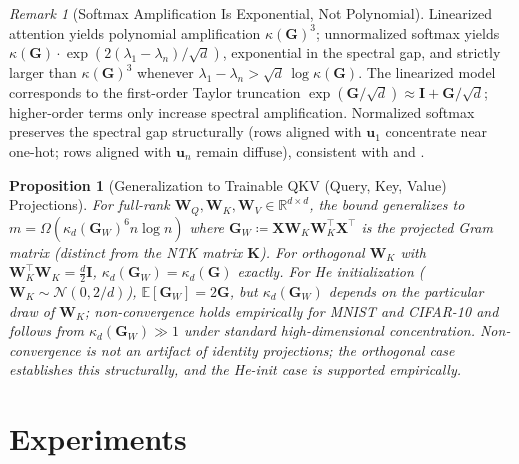 \documentclass{article}
\theoremstyle{plain}
\newtheorem{proposition}[theorem]{Proposition}
\theoremstyle{definition}
\theoremstyle{remark}
\newtheorem{remark}[theorem]{Remark}
\newcommand{\R}{\mathbb{R}}
\newcommand{\E}{\mathbb{E}}
\begin{document}
\begin{remark}[Softmax Amplification Is Exponential, Not Polynomial]
\label{rmk:softmax_vs_linear}
Linearized attention yields polynomial amplification $\kappa(\mathbf{G})^3$; unnormalized softmax yields $\kappa(\mathbf{G})\cdot\exp(2(\lambda_1-\lambda_n)/\sqrt{d})$, exponential in the spectral gap, and strictly larger than $\kappa(\mathbf{G})^3$ whenever $\lambda_1 - \lambda_n > \sqrt{d}\,\log\kappa(\mathbf{G})$. The linearized model corresponds to the first-order Taylor truncation $\exp(\mathbf{G}/\sqrt{d}) \approx \mathbf{I} + \mathbf{G}/\sqrt{d}$; higher-order terms only increase spectral amplification. Normalized softmax preserves the spectral gap structurally (rows aligned with $\mathbf{u}_1$ concentrate near one-hot; rows aligned with $\mathbf{u}_n$ remain diffuse), consistent with \citet{bae2022ifsanswer} and \citet{sakai2025nngp}.
\end{remark}

\begin{proposition}[Generalization to Trainable QKV (Query, Key, Value) Projections]
\label{prop:qkv_generalization}
For full-rank $\mathbf{W}_Q, \mathbf{W}_K, \mathbf{W}_V \in \R^{d \times d}$, the bound generalizes to $m = \Omega(\kappa_d(\mathbf{G}_W)^6 n\log n)$ where $\mathbf{G}_W \coloneq \mathbf{X}\mathbf{W}_K\mathbf{W}_K^\top\mathbf{X}^\top$ is the projected Gram matrix (distinct from the NTK matrix $\mathbf{K}$). For orthogonal $\mathbf{W}_K$ with $\mathbf{W}_K^\top\mathbf{W}_K = \frac{d}{2}\mathbf{I}$, $\kappa_d(\mathbf{G}_W) = \kappa_d(\mathbf{G})$ exactly. For He initialization ($\mathbf{W}_K \sim \mathcal{N}(0, 2/d)$), $\E[\mathbf{G}_W] = 2\mathbf{G}$, but $\kappa_d(\mathbf{G}_W)$ depends on the particular draw of $\mathbf{W}_K$; non-convergence holds empirically for MNIST and CIFAR-10 and follows from $\kappa_d(\mathbf{G}_W) \gg 1$ under standard high-dimensional concentration. Non-convergence is not an artifact of identity projections; the orthogonal case establishes this structurally, and the He-init case is supported empirically.
\end{proposition}

\section{Experiments}
\label{sec:experiments}
\end{document}
